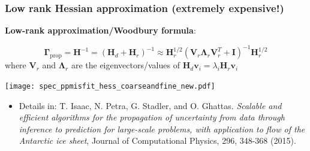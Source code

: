 \documentclass[10pt,final,xcolor=dvipsnames]{beamer}
\newcommand{\bs}[1]{\ensuremath{\boldsymbol{#1}}}
\newcommand{\Hmatrix}{\bs{H}}
\begin{document}
%  
%  
%  
%
\begin{frame}
	\frametitle{Low rank Hessian approximation (extremely expensive!)}
	
	\textbf{Low-rank approximation/Woodbury formula}:
	
	\[
	\boldsymbol{\Gamma}_\text{prop} = \Hmatrix^{-1} =
	\left ( {\bs{H}_d} + \mathbf{H}_r \right)^{-1}
	\approx \mathbf{H}_r^{1/2} (\bs{V}_r \bs{\Lambda}_r \bs{V}^T_r + \bs{I})^{-1}
	\mathbf{H}_r^{1/2} 
	\]
	where $\bs{V}_r$ and $\bs{\Lambda}_r$ are the eigenvectors/values of
	$\bs{H}_d \bs{v}_i = \lambda_i \mathbf{H}_r \bs{v}_i $
	\begin{center}
	\texttt{[image: spec\_ppmisfit\_hess\_coarseandfine\_new.pdf]}
	\end{center}

\begin{itemize}
	\item [] \scriptsize{Details in: T. Isaac, N. Petra, G. Stadler, and
		O. Ghattas. {\em Scalable and efficient algorithms for the
			propagation of uncertainty from data through inference to
			prediction for large-scale problems, with application to flow of
			the Antarctic ice sheet}, Journal of Computational Physics, 296,
		348-368 (2015).}
\end{itemize}
\end{frame}
\end{document}
